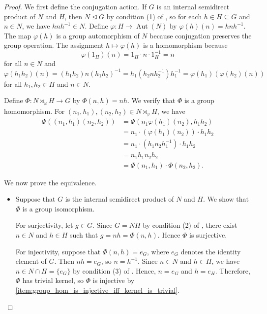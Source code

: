 \begin{proof}
    We first define the conjugation action. If $G$ is an internal semidirect product of $N$ and $H$, then $N \trianglelefteq G$ by condition (1) of , so for each $h \in H \subseteq G$ and $n \in N$, we have $hnh^{-1} \in N$. Define $\varphi: H \to \operatorname{Aut}(N)$ by $\varphi(h)(n) = hnh^{-1}$. The map $\varphi(h)$ is a group automorphism of $N$ because conjugation preserves the group operation. The assignment $h \mapsto \varphi(h)$ is a homomorphism because
    $$\varphi(1_H)(n) = 1_H \cdot n \cdot 1_H^{-1} = n$$
    for all $n \in N$ and
    $$\varphi(h_1 h_2)(n) = (h_1 h_2)n(h_1 h_2)^{-1} = h_1(h_2nh_2^{-1})h_1^{-1} = \varphi(h_1)(\varphi(h_2)(n))$$
    for all $h_1, h_2 \in H$ and $n \in N$.

    Define $\Phi: N \rtimes_\varphi H \to G$ by $\Phi(n, h) = nh$. We verify that $\Phi$ is a group homomorphism. For $(n_1, h_1), (n_2, h_2) \in N \rtimes_\varphi H$, we have
    \begin{align*}
        \Phi((n_1, h_1)(n_2, h_2)) &= \Phi(n_1\varphi(h_1)(n_2), h_1h_2) \\
        &= n_1\cdot (\varphi(h_1)(n_2)) \cdot h_1h_2 \\
        &= n_1 \cdot (h_1n_2h_1^{-1}) \cdot h_1h_2 \\
        &= n_1h_1n_2h_2 \\
        &= \Phi(n_1, h_1) \cdot \Phi(n_2, h_2).
    \end{align*}

    We now prove the equivalence.

    \begin{itemize}
        \item Suppose that $G$ is the internal semidirect product of $N$ and $H$. We show that $\Phi$ is a group isomorphism.

        For surjectivity, let $g \in G$. Since $G = NH$ by condition (2) of , there exist $n \in N$ and $h \in H$ such that $g = nh = \Phi(n, h)$. Hence $\Phi$ is surjective.

        For injectivity, suppose that $\Phi(n, h) = e_G$, where $e_G$ denotes the identity element of $G$. Then $nh = e_G$, so $n = h^{-1}$. Since $n \in N$ and $h \in H$, we have $n \in N \cap H = \{e_G\}$ by condition (3) of . Hence, $n = e_G$ and $h = e_H$. Therefore, $\Phi$ has trivial kernel, so $\Phi$ is injective by \eqref{item:group_hom_is_injective_iff_kernel_is_trivial}.


\end{itemize}
\end{proof}
